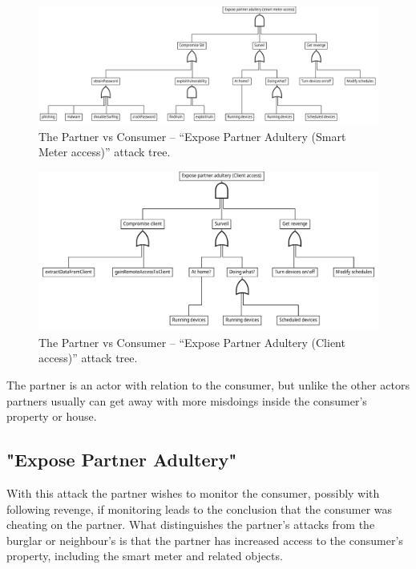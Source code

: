 \begin{figure}[h]
  \centering
  \includegraphics[angle=90,height=\textheight]{figures/graphviz/partner_vs_consumer_sm.pdf}
  \caption{The Partner vs Consumer -- ``Expose Partner Adultery (Smart Meter access)'' attack tree.}
  \label{fig:attack_trees:partner:cheater_sm}
\end{figure}

\begin{figure}[h]
  \includegraphics[angle=90,height=\textheight]{figures/graphviz/partner_vs_consumer_client.pdf}
  \caption{The Partner vs Consumer -- ``Expose Partner Adultery (Client access)'' attack tree.}
  \label{fig:attack_trees:partner:cheater_client}
\end{figure}

The partner is an actor with relation to the consumer, but unlike the other actors partners usually can get away with more misdoings inside the consumer's property or house.

\subsection{"Expose Partner Adultery"}

With this attack the partner wishes to monitor the consumer, possibly with following revenge, if monitoring leads to the conclusion that the consumer was cheating on the partner.
What distinguishes the partner's attacks from the burglar or neighbour's is that the partner has increased access to the consumer's property, including the smart meter and related objects.

